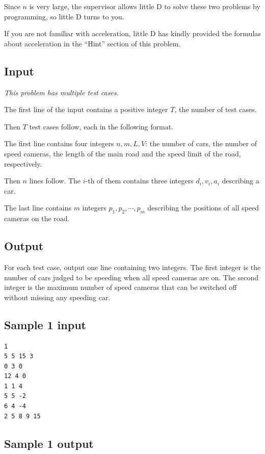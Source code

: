 \documentclass[11pt]{article}
\begin{document}
Since $n$ is very large, the supervisor allows little D to solve these two
problems by programming, so little D turns to you.

If you are not familiar with acceleration, little D has kindly provided the
formulas about acceleration in the ``Hint'' section of this problem.

\subsection*{Input}

\emph{This problem has multiple test cases.}

The first line of the input contains a positive integer $T$, the number of
test cases.

Then $T$ test cases follow, each in the following format.

The first line contains four integers $n, m, L, V$: the number of cars,
the number of speed cameras, the length of the main road and the speed
limit of the road, respectively.

Then $n$ lines follow.
The $i$-th of them contains three integers $d_i, v_i, a_i$ describing a
car.

The last line contains $m$ integers $p_1, p_2, \cdots, p_m$ describing the
positions of all speed cameras on the road.

\subsection*{Output}

For each test case, output one line containing two integers.
The first integer is the number of cars judged to be speeding when all
speed cameras are on.
The second integer is the maximum number of speed cameras that can be
switched off without missing any speeding car.

\subsection*{Sample 1 input}

\begin{verbatim}
1
5 5 15 3
0 3 0
12 4 0
1 1 4
5 5 -2
6 4 -4
2 5 8 9 15
\end{verbatim}

\subsection*{Sample 1 output}
\end{document}
